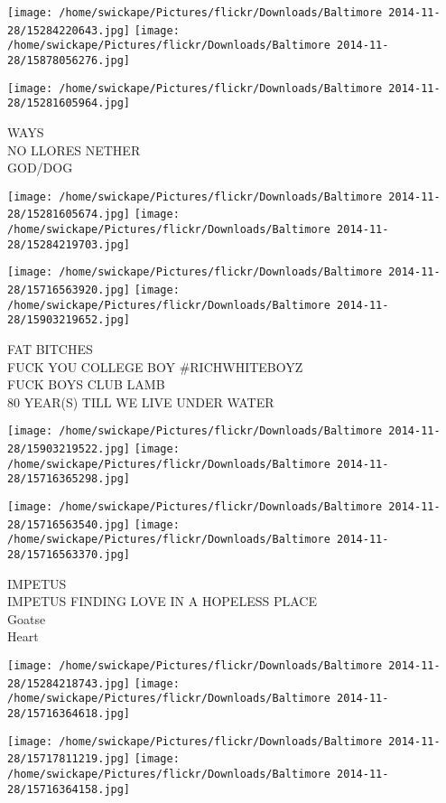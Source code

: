\documentclass[10pt,letterpaper]{article}
\begin{document}
\texttt{[image: /home/swickape/Pictures/flickr/Downloads/Baltimore 2014-11-28/15284220643.jpg]}
\texttt{[image: /home/swickape/Pictures/flickr/Downloads/Baltimore 2014-11-28/15878056276.jpg]}

\vspace{0.25in}
\texttt{[image: /home/swickape/Pictures/flickr/Downloads/Baltimore 2014-11-28/15281605964.jpg]}

WAYS\\
NO LLORES NETHER\\
GOD/DOG
\pagebreak

\texttt{[image: /home/swickape/Pictures/flickr/Downloads/Baltimore 2014-11-28/15281605674.jpg]}
\texttt{[image: /home/swickape/Pictures/flickr/Downloads/Baltimore 2014-11-28/15284219703.jpg]}

\texttt{[image: /home/swickape/Pictures/flickr/Downloads/Baltimore 2014-11-28/15716563920.jpg]}
\texttt{[image: /home/swickape/Pictures/flickr/Downloads/Baltimore 2014-11-28/15903219652.jpg]}

FAT BITCHES\\
FUCK YOU COLLEGE BOY \#RICHWHITEBOYZ\\
FUCK BOYS CLUB LAMB\\
80 YEAR(S) TILL WE LIVE UNDER WATER
\pagebreak

\texttt{[image: /home/swickape/Pictures/flickr/Downloads/Baltimore 2014-11-28/15903219522.jpg]}
\texttt{[image: /home/swickape/Pictures/flickr/Downloads/Baltimore 2014-11-28/15716365298.jpg]}

\texttt{[image: /home/swickape/Pictures/flickr/Downloads/Baltimore 2014-11-28/15716563540.jpg]}
\texttt{[image: /home/swickape/Pictures/flickr/Downloads/Baltimore 2014-11-28/15716563370.jpg]}

IMPETUS\\
IMPETUS FINDING LOVE IN A HOPELESS PLACE\\
Goatse\\
Heart
\pagebreak

\texttt{[image: /home/swickape/Pictures/flickr/Downloads/Baltimore 2014-11-28/15284218743.jpg]}
\texttt{[image: /home/swickape/Pictures/flickr/Downloads/Baltimore 2014-11-28/15716364618.jpg]}

\texttt{[image: /home/swickape/Pictures/flickr/Downloads/Baltimore 2014-11-28/15717811219.jpg]}
\texttt{[image: /home/swickape/Pictures/flickr/Downloads/Baltimore 2014-11-28/15716364158.jpg]}
\end{document}
